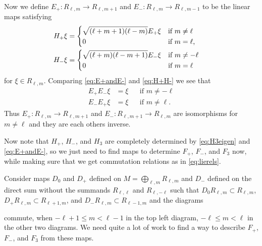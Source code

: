 Now we define $E_+ \colon R_{\ell,m}\to R_{\ell,m+1}$ and $E_- \colon R_{\ell,m}\to R_{\ell,m-1}$ to be the linear maps satisfying
\begin{align}
  \begin{split} \label{eq:E+andE-}
    H_+ \xi &=
    \begin{dcases*}
      \sqrt{(\ell+m+1)(\ell-m)}E_+\xi & if $m\neq \ell$ \\
      0 & if $m=\ell$,
    \end{dcases*} \\
    H_- \xi &=
    \begin{dcases*}
      \sqrt{(\ell+m)(\ell-m+1)}E_-\xi & if $m\neq -\ell$ \\
      0 & if $m=\ell$
    \end{dcases*}
  \end{split}
\end{align}
for $\xi\in R_{\ell,m}$. Comparing \cref{eq:E+andE-} and \cref{eq:H+H-} we see that
\begin{align*}
  E_+E_-\xi &= \xi && \mbox{if }m\neq-\ell \\
  E_-E_+\xi &= \xi && \mbox{if }m\neq\ell.
\end{align*}
Thus $E_+\colon R_{\ell,m}\to R_{\ell,m+1}$ and $E_-\colon R_{\ell,m+1}\to R_{\ell,m}$ are isomorphisms for $m\neq\ell$ and they are each others inverse. 

Now note that $H_+$, $H_-$, and $H_3$ are completely determined by \cref{eq:H3eigen} and \cref{eq:E+andE-}, so we just need to find maps to determine $F_+$, $F_-$, and $F_3$ now, while making sure that we get commutation relations as in \cref{eq:lierels}.

Consider maps $D_0$ and $D_+$ defined on $M=\bigoplus_{\ell,m} R_{\ell,m}$ and $D_-$ defined on the direct sum without the summands $R_{\ell,\ell}$ and $R_{\ell,-\ell}$ such that $D_0 R_{\ell,m}\subset R_{\ell,m}$, $D_+ R_{\ell,m} \subset R_{\ell+1,m}$, and $D_- R_{\ell,m} \subset R_{\ell-1,m}$ and the diagrams
\begin{center}
\end{center}
commute, when $-\ell+1\leq m < \ell-1$ in the top left diagram, $-\ell\leq m<\ell$ in the other two diagrams. We need quite a lot of work to find a way to describe $F_+$, $F_-$, and $F_3$ from these maps.

